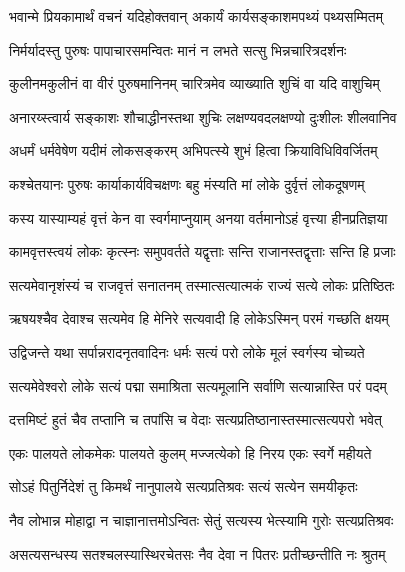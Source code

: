 \twolineshloka
{भवान्मे प्रियकामार्थं वचनं यदिहोक्तवान्}
{अकार्यं कार्यसङ्काशमपथ्यं पथ्यसम्मितम्} %

\twolineshloka
{निर्मर्यादस्तु पुरुषः पापाचारसमन्वितः}
{मानं न लभते सत्सु भिन्नचारित्रदर्शनः} %

\twolineshloka
{कुलीनमकुलीनं वा वीरं पुरुषमानिनम्}
{चारित्रमेव व्याख्याति शुचिं वा यदि वाशुचिम्} %

\twolineshloka
{अनारय्स्त्वार्य सङ्काशः शौचाद्धीनस्तथा शुचिः}
{लक्षण्यवदलक्षण्यो दुःशीलः शीलवानिव} %

\twolineshloka
{अधर्मं धर्मवेषेण यदीमं लोकसङ्करम्}
{अभिपत्स्ये शुभं हित्वा क्रियाविधिविवर्जितम्} %

\twolineshloka
{कश्चेतयानः पुरुषः कार्याकार्यविचक्षणः}
{बहु मंस्यति मां लोके दुर्वृत्तं लोकदूषणम्} %

\twolineshloka
{कस्य यास्याम्यहं वृत्तं केन वा स्वर्गमाप्नुयाम्}
{अनया वर्तमानोऽहं वृत्त्या हीनप्रतिज्ञया} %

\twolineshloka
{कामवृत्तस्त्वयं लोकः कृत्स्नः समुपवर्तते}
{यद्वृत्ताः सन्ति राजानस्तद्वृत्ताः सन्ति हि प्रजाः} %

\twolineshloka
{सत्यमेवानृशंस्यं च राजवृत्तं सनातनम्}
{तस्मात्सत्यात्मकं राज्यं सत्ये लोकः प्रतिष्ठितः} %

\twolineshloka
{ऋषयश्चैव देवाश्च सत्यमेव हि मेनिरे}
{सत्यवादी हि लोकेऽस्मिन् परमं गच्छति क्षयम्} %

\twolineshloka
{उद्विजन्ते यथा सर्पान्नरादनृतवादिनः}
{धर्मः सत्यं परो लोके मूलं स्वर्गस्य चोच्यते} %

\twolineshloka
{सत्यमेवेश्वरो लोके सत्यं पद्मा समाश्रिता}
{सत्यमूलानि सर्वाणि सत्यान्नास्ति परं पदम्} %

\twolineshloka
{दत्तमिष्टं हुतं चैव तप्तानि च तपांसि च}
{वेदाः सत्यप्रतिष्ठानास्तस्मात्सत्यपरो भवेत्} %

\twolineshloka
{एकः पालयते लोकमेकः पालयते कुलम्}
{मज्जत्येको हि निरय एकः स्वर्गे महीयते} %

\twolineshloka
{सोऽहं पितुर्निदेशं तु किमर्थं नानुपालये}
{सत्यप्रतिश्रवः सत्यं सत्येन समयीकृतः} %

\twolineshloka
{नैव लोभान्न मोहाद्वा न चाज्ञानात्तमोऽन्वितः}
{सेतुं सत्यस्य भेत्स्यामि गुरोः सत्यप्रतिश्रवः} %

\twolineshloka
{असत्यसन्धस्य सतश्चलस्यास्थिरचेतसः}
{नैव देवा न पितरः प्रतीच्छन्तीति नः श्रुतम्} %

